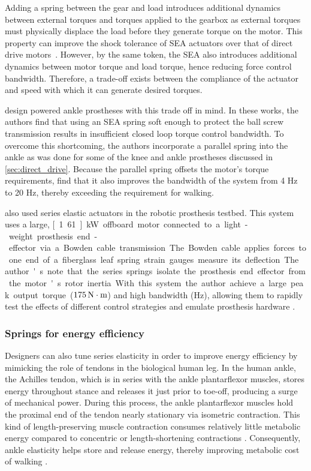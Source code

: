 Adding a spring between the gear and load introduces additional dynamics between
external torques and torques applied to the gearbox as external torques must
physically displace the load before they generate torque on the motor. This
property can improve the shock tolerance of SEA actuators over that of direct
drive motors~\citep{robinson2000design}. However, by the same token, the SEA
also introduces additional dynamics between motor torque and load torque, hence
reducing force control bandwidth. Therefore, a trade-off exists between the
compliance of the actuator and speed with which it can generate desired torques.

\citet{au2007biomechanical, au2008powered} design powered ankle prostheses with
this trade off in mind. In these works, the authors find that using an SEA
spring soft enough to protect the ball screw transmission results in
insufficient closed loop torque control bandwidth. To overcome this shortcoming,
the authors incorporate a parallel spring into the ankle as was done for some of
the knee and ankle prostheses discussed in \cref{sec:direct_drive}. Because the
parallel spring offsets the motor's torque requirements,
\citeauthor{au2008powered} find that it also improves the bandwidth of the
system from 4 Hz to 20 Hz, thereby exceeding the requirement for walking. 

\citet{caputo2013experimental} also used series elastic actuators in the robotic
prosthesis testbed. This system uses a large, \unit[1.61]{kW} offboard motor
connected to a light-weight prosthesis end-effector via a Bowden cable
transmission. The Bowden cable applies forces to one end of a fiberglass leaf
spring strain gauges measure its deflection. The author's note that the series 
springs isolate the prosthesis end effector from the motor's rotor inertia. With
this system the author achieve a large peak output torque ($\unit[175]{N \cdot m}$)
and high bandwidth (\unit[17]{Hz}), allowing them to rapidly test the effects of
different control strategies and emulate prosthesis hardware
\citep{caputo2015informing}.

\subsubsection{Springs for energy efficiency}
Designers can also tune series elasticity in order to improve energy efficiency
by mimicking the role of tendons in the biological human leg. In the human
ankle, the Achilles tendon, which is in series with the ankle plantarflexor
muscles, stores energy throughout stance and releases it just prior to toe-off,
producing a surge of mechanical power. During this process, the ankle
plantarflexor muscles hold the proximal end of the tendon nearly stationary via
isometric contraction. This kind of length-preserving muscle contraction
consumes relatively little metabolic energy compared to concentric or
length-shortening contractions \citep{rall1984energetic}. Consequently, ankle
elasticity helps store and release energy, thereby improving metabolic cost of
walking \citep{sawicki2009pays}.

